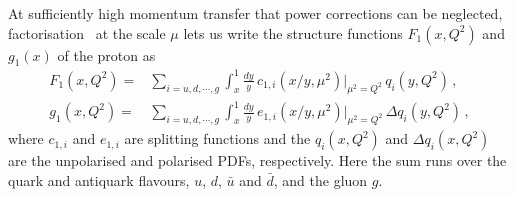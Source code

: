 At sufficiently high momentum transfer that power corrections can be neglected, factorisation~\cite{Sterman:1995fz} at the scale $\mu$ lets us write the structure functions $F_1(x,Q^2)$ and $g_1(x)$ of the proton as 
\begin{align}
F_1(x,Q^2) = {} & \sum_{i=u,d, \cdots, g} \int_x^1\frac{dy}{y}\, c_{1,i}(x/y,\mu^2)|_{\mu^2=Q^2}\, q_i(y,Q^2) \,,\\
g_1(x,Q^2) = {} & \sum_{i=u,d, \cdots, g} \int_x^1\frac{dy}{y}\, e_{1,i}(x/y,\mu^2)|_{\mu^2=Q^2}\, \Delta q_i(y,Q^2) \,,
\label{pdf}
\end{align}
where $c_{1,i}$ and $e_{1,i}$ are splitting functions and the $q_i(x,Q^2)$ and $\Delta q_i(x,Q^2)$ are the unpolarised and polarised PDFs, respectively. Here the sum runs over the quark and antiquark flavours, $u$, $d$, $\bar{u}$ and $\bar{d}$, and the gluon $g$.

